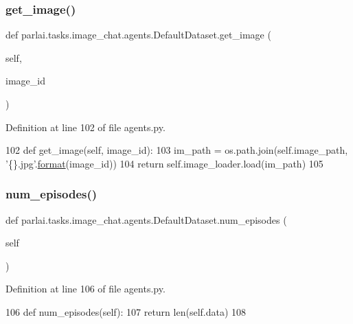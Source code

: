 \subsubsection{\texorpdfstring{get\+\_\+image()}{get\_image()}}
{\footnotesize\ttfamily def parlai.\+tasks.\+image\+\_\+chat.\+agents.\+Default\+Dataset.\+get\+\_\+image (\begin{DoxyParamCaption}\item[{}]{self,  }\item[{}]{image\+\_\+id }\end{DoxyParamCaption})}



Definition at line 102 of file agents.\+py.


\begin{DoxyCode}
102     \textcolor{keyword}{def }get\_image(self, image\_id):
103         im\_path = os.path.join(self.image\_path, \textcolor{stringliteral}{'\{\}.jpg'}.\hyperlink{namespaceparlai_1_1chat__service_1_1services_1_1messenger_1_1shared__utils_a32e2e2022b824fbaf80c747160b52a76}{format}(image\_id))
104         \textcolor{keywordflow}{return} self.image\_loader.load(im\_path)
105 
\end{DoxyCode}
\mbox{\label{classparlai_1_1tasks_1_1image__chat_1_1agents_1_1DefaultDataset_afd35ea4ecd0e16f58eceb52317da429e}} 
\subsubsection{\texorpdfstring{num\+\_\+episodes()}{num\_episodes()}}
{\footnotesize\ttfamily def parlai.\+tasks.\+image\+\_\+chat.\+agents.\+Default\+Dataset.\+num\+\_\+episodes (\begin{DoxyParamCaption}\item[{}]{self }\end{DoxyParamCaption})}



Definition at line 106 of file agents.\+py.


\begin{DoxyCode}
106     \textcolor{keyword}{def }num\_episodes(self):
107         \textcolor{keywordflow}{return} len(self.data)
108 
\end{DoxyCode}
\mbox{\label{classparlai_1_1tasks_1_1image__chat_1_1agents_1_1DefaultDataset_a50e9a914fa61e0070403b5806a9c392b}} 
